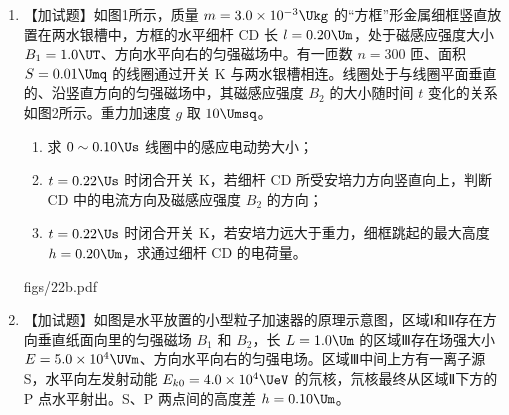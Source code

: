 \documentclass[\gkver]{gaokaozhenti}
\begin{document}
\begin{enumerate}
\item
【加试题】如图1所示，质量 $m=3.0\times10^{-3}\Ukg$ 的“方框”形金属细框竖直放置在两水银槽中，方框的水平细杆 CD 长 $l=0.20\Um$，处于磁感应强度大小 $B_{1}=1.0\UT$、方向水平向右的匀强磁场中。有一匝数 $n=300$ 匝、面积 $S=0.01\Umq$ 的线圈通过开关 K 与两水银槽相连。线圈处于与线圈平面垂直的、沿竖直方向的匀强磁场中，其磁感应强度 $B_{2}$ 的大小随时间 $t$ 变化的关系如图2所示。重力加速度 $g$ 取 $10\Umsq$。
\begin{enumerate}
	\item
	求 $0\sim0.10\Us$ 线圈中的感应电动势大小；
	\item
	$t=0.22\Us$ 时闭合开关 K，若细杆 CD 所受安培力方向竖直向上，判断 CD 中的电流方向及磁感应强度 $B_{2}$ 的方向；
	\item
	$t=0.22\Us$ 时闭合开关 K，若安培力远大于重力，细框跳起的最大高度 $h=0.20\Um$，求通过细杆 CD 的电荷量。
\end{enumerate}
{figs/22b.pdf}

\item
【加试题】如图是水平放置的小型粒子加速器的原理示意图，区域Ⅰ和Ⅱ存在方向垂直纸面向里的匀强磁场 $B_{1}$ 和 $B_{2}$，长 $L=1.0\Um$ 的区域Ⅲ存在场强大小 $E=5.0\times10^{4}\UVm$、方向水平向右的匀强电场。区域Ⅲ中间上方有一离子源 S，水平向左发射动能 $E_{k0}=4.0\times10^{4}\UeV$ 的氘核，氘核最终从区域Ⅱ下方的 P 点水平射出。S、P 两点间的高度差 $h=0.10\Um$。


\end{enumerate}
\end{document}
